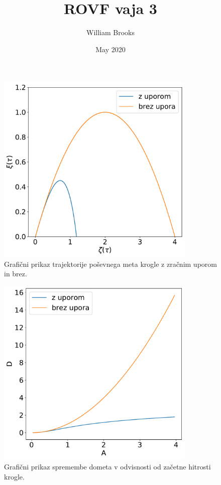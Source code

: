 \documentclass{article}
\title{ROVF vaja 3}
\author{William Brooks }
\date{May 2020}
\begin{document}
\maketitle

\begin{figure}[h]
\begin{center}

    \includegraphics[width=9.5cm]{meta.pdf}
\caption{Grafi\v cni prikaz trajektorije po\v sevnega meta krogle z zra\v cnim uporom in brez.}

\end{center}
\end{figure}

\begin{figure}[h]
\begin{center}

    \includegraphics[width=9.5cm]{domet_A.pdf}
\caption{Grafi\v cni prikaz spremembe dometa v odvisnosti od za\v cetne hitrosti krogle.}

\end{center}
\end{figure}

\begin{figure}[h]

\end{figure}
\end{document}
